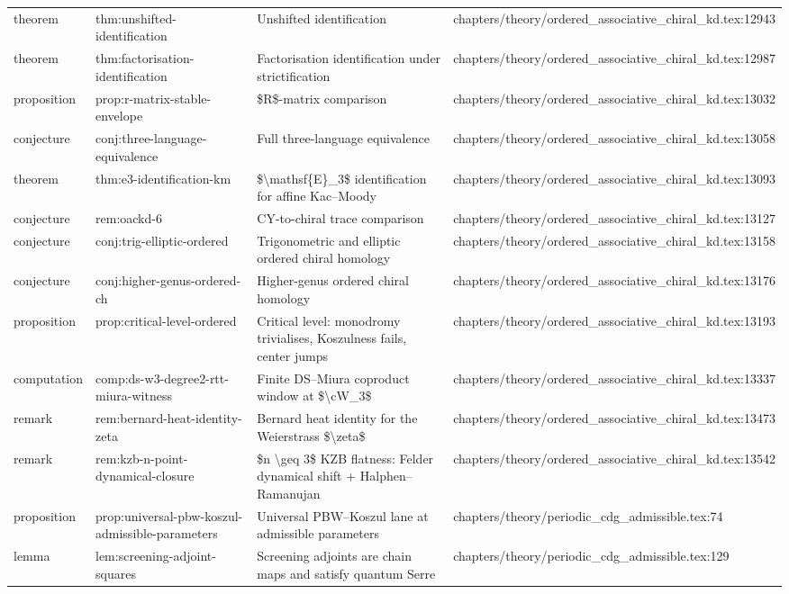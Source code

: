 \documentclass[11pt]{article}
\begin{document}
\begin{longtable}{L{0.10\textwidth}L{0.26\textwidth}L{0.42\textwidth}L{0.22\textwidth}}
theorem & thm:unshifted-identification & Unshifted identification & chapters/theory/ordered\_associative\_chiral\_kd.tex:12943\\
theorem & thm:factorisation-identification & Factorisation identification under strictification & chapters/theory/ordered\_associative\_chiral\_kd.tex:12987\\
proposition & prop:r-matrix-stable-envelope & \$R\$-matrix comparison & chapters/theory/ordered\_associative\_chiral\_kd.tex:13032\\
conjecture & conj:three-language-equivalence & Full three-language equivalence & chapters/theory/ordered\_associative\_chiral\_kd.tex:13058\\
theorem & thm:e3-identification-km & \$\textbackslash{}mathsf\{E\}\_3\$ identification for affine Kac--Moody & chapters/theory/ordered\_associative\_chiral\_kd.tex:13093\\
conjecture & rem:oackd-6 & CY-to-chiral trace comparison & chapters/theory/ordered\_associative\_chiral\_kd.tex:13127\\
conjecture & conj:trig-elliptic-ordered & Trigonometric and elliptic ordered chiral homology & chapters/theory/ordered\_associative\_chiral\_kd.tex:13158\\
conjecture & conj:higher-genus-ordered-ch & Higher-genus ordered chiral homology & chapters/theory/ordered\_associative\_chiral\_kd.tex:13176\\
proposition & prop:critical-level-ordered & Critical level: monodromy trivialises, Koszulness fails, center jumps & chapters/theory/ordered\_associative\_chiral\_kd.tex:13193\\
computation & comp:ds-w3-degree2-rtt-miura-witness & Finite DS--Miura coproduct window at \$\textbackslash{}cW\_3\$ & chapters/theory/ordered\_associative\_chiral\_kd.tex:13337\\
remark & rem:bernard-heat-identity-zeta & Bernard heat identity for the Weierstrass \$\textbackslash{}zeta\$ & chapters/theory/ordered\_associative\_chiral\_kd.tex:13473\\
remark & rem:kzb-n-point-dynamical-closure & \$n \textbackslash{}geq 3\$ KZB flatness: Felder dynamical shift + Halphen--Ramanujan & chapters/theory/ordered\_associative\_chiral\_kd.tex:13542\\
proposition & prop:universal-pbw-koszul-admissible-parameters & Universal PBW--Koszul lane at admissible parameters & chapters/theory/periodic\_cdg\_admissible.tex:74\\
lemma & lem:screening-adjoint-squares & Screening adjoints are chain maps and satisfy quantum Serre & chapters/theory/periodic\_cdg\_admissible.tex:129\\

\end{longtable}
\end{document}
